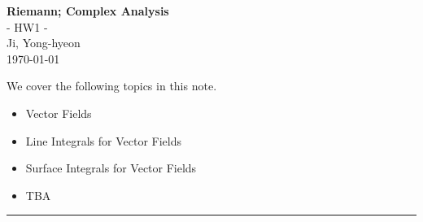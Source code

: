 \documentclass[11pt,openany]{article}
\begin{document}
\begin{center}
	\huge\textbf{Riemann; Complex Analysis}\\
	\Large - HW1 -\\
	\vspace{0.5em}
	\large{Ji, Yong-hyeon}\\
	\vspace{0.5em}
	\normalsize{\today}\\
\end{center}

\noindent 
We cover the following topics in this note.
\begin{itemize}
	\item Vector Fields
	\item Line Integrals for Vector Fields
	\item Surface Integrals for Vector Fields
	\item TBA
\end{itemize}
\hrule\vspace{12pt}
\tableofcontents

\newpage
\end{document}
